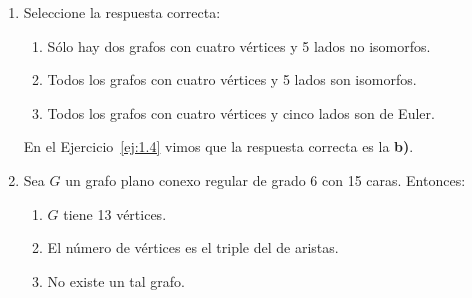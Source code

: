 \begin{ejercicio}
\begin{enumerate}
\begin{figure}
\begin{subfigure}{0.45\textwidth}
                \caption{Grafo $G$.}
                \label{fig:1.27_2_G}
            \end{subfigure}
            \begin{subfigure}{0.45\textwidth}
                \centering
                \caption{Grafo $G'$.}
                \label{fig:1.27_2_Gp}
            \end{subfigure}
            \caption{Grafos para el ejercicio~\ref{ej:1.27}.\ref{ej:1.27_2}.}
            \label{fig:1.27_2}
        \end{figure}

        Consideramos el contraejemplo de la Figura~\ref{fig:1.27_2}. El grafo $G$ de la Figura~\ref{fig:1.27_2_G} es de Euler y de Hamilton, pero su subgrafo completo $G'$ de la Figura~\ref{fig:1.27_2_Gp} no es ni de Euler ni de Hamilton. Por tanto, la respuesta correcta es la \textbf{c)}.
        \item Seleccione la respuesta correcta:
        \begin{enumerate}
            \item Sólo hay dos grafos con cuatro vértices y 5 lados no isomorfos.
            \item Todos los grafos con cuatro vértices y 5 lados son isomorfos.
            \item Todos los grafos con cuatro vértices y cinco lados son de Euler.
        \end{enumerate}
        En el Ejercicio~\ref{ej:1.4} vimos que la respuesta correcta es la \textbf{b)}.
        \item Sea $G$ un grafo plano conexo regular de grado 6 con 15 caras. Entonces:
        \begin{enumerate}
            \item $G$ tiene 13 vértices.
            \item El número de vértices es el triple del de aristas.
            \item No existe un tal grafo.
        \end{enumerate}
        

\end{enumerate}
\end{ejercicio}

